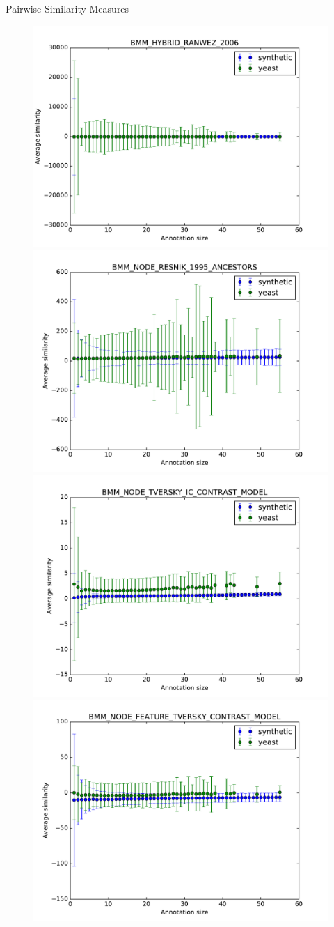 \documentclass{beamer}
\begin{document}
\begin{frame}{Pairwise Similarity Measures}
\begin{figure}
\includegraphics[width=0.5\linewidth, height=0.4\textheight]{pairwise/SIM_GROUPWISE_BMM_SIM_PAIRWISE_DAG_HYBRID_RANWEZ_2006_avg.pdf}
\includegraphics[width=0.5\linewidth, height=0.4\textheight]{pairwise/SIM_GROUPWISE_BMM_SIM_PAIRWISE_DAG_NODE_RESNIK_1995_ANCESTORS_avg.pdf} \\
\includegraphics[width=0.5\linewidth, height=0.4\textheight]{pairwise/SIM_GROUPWISE_BMM_SIM_PAIRWISE_DAG_NODE_TVERSKY_IC_CONTRAST_MODEL_avg.pdf}
\includegraphics[width=0.5\linewidth, height=0.4\textheight]{pairwise/SIM_GROUPWISE_BMM_SIM_PAIRWISE_DAG_NODE_FEATURE_TVERSKY_CONTRAST_MODEL_avg.pdf}
\end{figure}
\end{frame}
\end{document}
